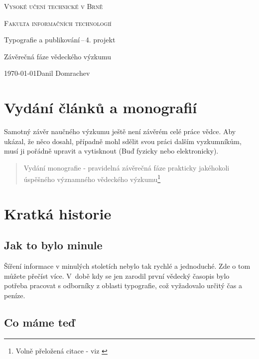 \documentclass[a4paper,11pt,draft]{article}
\begin{document}
	\begin{titlepage}
		\setcounter{page}{0}
		\begin{center}	
			\addtolength{\parskip}{0.6em}
			{\Huge
				\textsc{
					Vysoké učení technické v Brně}}
			
			{\huge 
				\textsc{
					Fakulta informačních technologií}}
			
			{\LARGE
				Typografie a publikování\,--\,4. projekt
				
				\Huge Závěrečná fáze vědeckého výzkumu }
			
		\end{center}
		{\Large 
			\today \hfill Danil Domrachev}
	\end{titlepage}

	\newpage
	\raggedright
	
	\section{Vydání článků a monografií}
	
	Samotný závěr naučného výzkumu ještě není závěrém celé práce vědce. Aby ukázal, že něco dosahl, případně mohl sdělit svou práci dalším vyzkumníkům, musí ji pořádně upravit a vytisknout (Buď fyzicky nebo elektronicky).
	
	\begin{quotation}
	\centering
	Vydání monografie - pravidelná závěrečná fáze prakticky
	jakéhokoli úspěšného významného vědeckého výzkumu\footnote{Volně přeložená citace - viz \cite{clserpub1}}
	\end{quotation}

	\section{Kratká historie}
	
	\subsection{Jak to bylo minule}
	Šíření informace v minulých stoletích nebylo tak rychlé a jednoduché. Zde \cite{el2} o tom můžete přečíst více. V~době kdy se jen zarodil první vědecký časopis bylo potřeba pracovat s odborníky z oblasti typografie, což vyžadovalo určitý čas a peníze.
	

	\subsection{Co máme teď}
	
\end{document}
